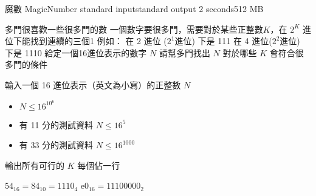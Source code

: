 \gdef\thisproblemauthor{}
\gdef\thisproblemdeveloper{}
\gdef\thisproblemorigin{}
\begin{problem}{魔數 MagicNumber}
{standard input}{standard output}
{2 seconds}{512 MB}{}

多門很喜歡一些很多門的數\newline
一個數字要很多門，需要對於某些正整數$K$，在 $2^K$ 進位下能找到連續的三個1\newline
\newline
例如： 在 2 進位 ($2^1$進位) 下是 111 在 4 進位($2^2$進位) 下是 1110\newline
\newline
給定一個16進位表示的數字 $N$\newline
請幫多門找出 $N$ 對於哪些 $K$ 會符合很多門的條件\newline

\InputFile

輸入一個 16 進位表示（英文為小寫）的正整數 $N$
\begin{iofmt}
\begin{itemize}
	\item $N \leq 16^{10^6}$
	\item 有 11 分的測試資料 $N \leq 16^5$
	\item 有 33 分的測試資料 $N \leq 16^{1000}$
\end{itemize}
\end{iofmt}

\OutputFile

輸出所有可行的 $K$ \newline
每個佔一行

\Examples

\begin{example}
%
%
%
\end{example}
$54_{16} = 84_{10} = 1110_4$ \newline
$\textrm{e}0_{16} = 1110 0000_2$ \newline

\end{problem}
